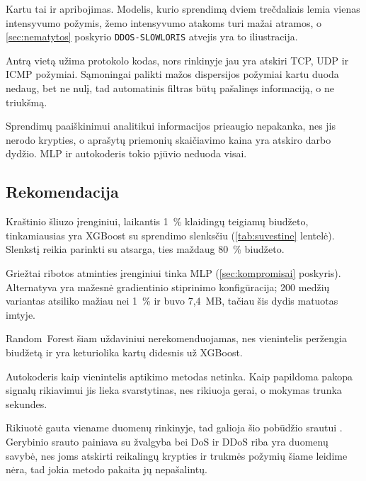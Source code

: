 Kartu tai ir apribojimas. Modelis, kurio sprendimą dviem trečdaliais
lemia vienas intensyvumo požymis, žemo intensyvumo atakoms turi mažai
atramos, o \ref{sec:nematytos} poskyrio \texttt{DDOS-SLOWLORIS} atvejis
yra to iliustracija.

Antrą vietą užima protokolo kodas, nors rinkinyje jau yra atskiri TCP,
UDP ir ICMP požymiai. Sąmoningai palikti mažos dispersijos požymiai
kartu duoda nedaug, bet ne nulį, tad automatinis filtras būtų pašalinęs
informaciją, o ne triukšmą.

Sprendimų paaiškinimui analitikui informacijos prieaugio nepakanka, nes
jis nerodo krypties, o \cite{mohale2025xai} aprašytų priemonių
skaičiavimo kaina yra atskiro darbo dydžio. MLP ir autokoderis tokio
pjūvio neduoda visai.


\subsection{Rekomendacija}
\label{sec:rekomendacija}

Kraštinio šliuzo įrenginiui, laikantis 1~\% klaidingų teigiamų
biudžeto, tinkamiausias yra XGBoost su sprendimo slenksčiu
(\ref{tab:suvestine} lentelė). Slenkstį reikia parinkti su atsarga, ties
maždaug 80~\% biudžeto.

Griežtai ribotos atminties įrenginiui tinka MLP
(\ref{sec:kompromisai} poskyris). Alternatyva yra mažesnė gradientinio
stiprinimo konfigūracija; 200 medžių variantas atsiliko mažiau nei
1~\% ir buvo 7,4~MB, tačiau šis dydis matuotas imtyje.

Random~Forest šiam uždaviniui nerekomenduojamas, nes vienintelis
peržengia biudžetą ir yra keturiolika kartų didesnis už XGBoost.

Autokoderis kaip vienintelis aptikimo metodas netinka. Kaip papildoma
pakopa signalų rikiavimui jis lieka svarstytinas, nes rikiuoja gerai, o
mokymas trunka sekundes.

Rikiuotė gauta viename duomenų rinkinyje, tad galioja šio pobūdžio
srautui \cite{eren2026drift}. Gerybinio srauto painiava su žvalgyba bei
DoS ir DDoS riba yra duomenų savybė, nes joms atskirti reikalingų
krypties ir trukmės požymių šiame leidime nėra, tad jokia metodo pakaita
jų nepašalintų.
